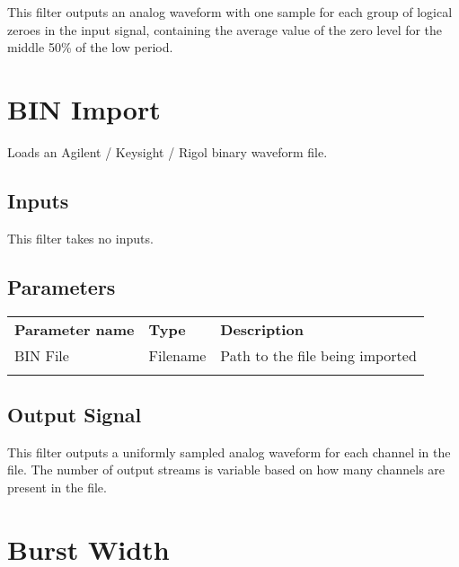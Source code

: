 This filter outputs an analog waveform with one sample for each group of logical zeroes in the input signal, containing
the average value of the zero level for the middle 50\% of the low period.

\pagebreak
\section{BIN Import}

Loads an Agilent / Keysight / Rigol binary waveform file.


\subsection{Inputs}

This filter takes no inputs.

\subsection{Parameters}

\begin{tabularx}{16cm}{llX}
\thickhline
\textbf{Parameter name} & \textbf{Type} & \textbf{Description} \\
\thickhline
BIN File & Filename & Path to the file being imported\\
\thickhline
\end{tabularx}

\subsection{Output Signal}

This filter outputs a uniformly sampled analog waveform for each channel in the file. The number of output streams is
variable based on how many channels are present in the file.

\pagebreak
\section{Burst Width}

